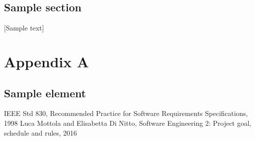 \documentclass[openright]{report}
\begin{document}
	\section{Sample section}
		[Sample text]


    \newpage
    \appendix
    \chapter{Appendix A}
    \section{Sample element}

	\newpage
	\begin{thebibliography}{10}
			IEEE Std 830, Recommended Practice for Software Requirements Specifications, 1998
			Luca Mottola and Elisabetta Di Nitto, Software Engineering 2: Project goal, schedule and rules, 2016
	\end{thebibliography}
\end{document}
